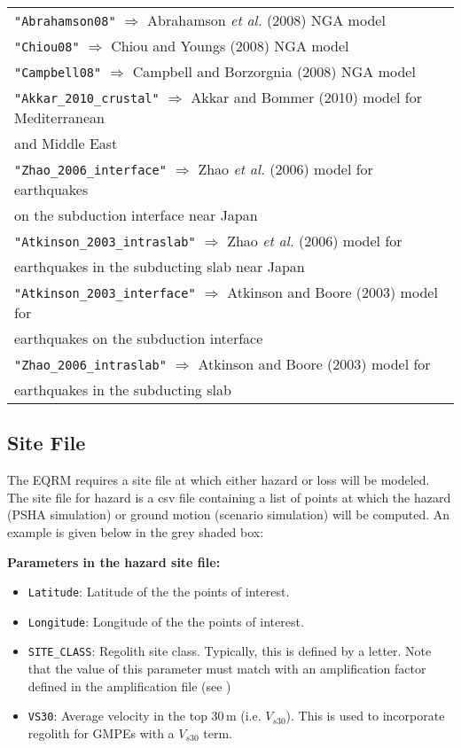 \begin{tabular}{|p{\textwidth}|}
\texttt{"Abrahamson08"} $\Rightarrow$ Abrahamson \textit{et al.} (2008) NGA model\\
\texttt{"Chiou08"} $\Rightarrow$ Chiou and Youngs (2008) NGA model \\
\texttt{"Campbell08"} $\Rightarrow$ Campbell and Borzorgnia (2008) NGA model \\
\texttt{"Akkar\_2010\_crustal"} $\Rightarrow$ Akkar and Bommer (2010) model for Mediterranean \\
\hspace{8em} and Middle East\\
\texttt{"Zhao\_2006\_interface"} $\Rightarrow$ Zhao \textit{et al.} (2006) model for earthquakes \\
\hspace{8em} on the subduction interface near Japan \\
\texttt{"Atkinson\_2003\_intraslab"} $\Rightarrow$ Zhao \textit{et al.} (2006) model for \\
\hspace{8em} earthquakes in the subducting slab near Japan\\
\texttt{"Atkinson\_2003\_interface"} $\Rightarrow$ Atkinson and Boore (2003) model for \\
\hspace{8em} earthquakes on the subduction interface\\
\texttt{"Zhao\_2006\_intraslab"} $\Rightarrow$ Atkinson and Boore (2003) model for \\
\hspace{8em} earthquakes in the subducting slab \\
\hline
\end{tabular}



\subsection{Site File}

The EQRM requires a site file at which either hazard or loss will be modeled.
The site file for hazard is a csv file
containing a list of points at which the hazard (PSHA simulation)
 or ground motion (scenario simulation) will be computed. An example is
 given below in the grey shaded box:


\textbf{Parameters in the hazard site file:}
\begin{itemize}
\item \texttt{Latitude}: Latitude of the the points of interest.
\item \texttt{Longitude}: Longitude of the the points of interest.
\item \texttt{SITE\_CLASS}: Regolith site class. Typically, this is defined
by a letter. Note that the value of this parameter must match with
an amplification factor defined in the amplification file (see
)
\item \texttt{VS30}: Average velocity in the top 30\,m (i.e. $V_{s30}$). This is used
to incorporate regolith for GMPEs with a $V_{s30}$ term.
\end{itemize}


